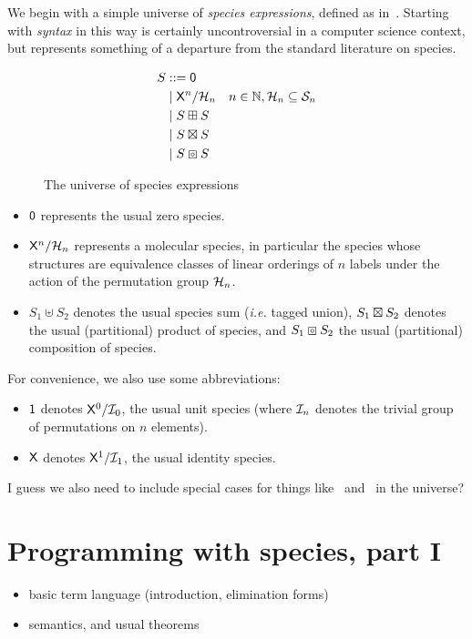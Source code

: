 \documentclass[9pt]{sigplanconf}
\newcommand{\pref}[1]{\prettyref{#1}}
\newcommand{\ie}{\emph{i.e.}\xspace}
\begin{document}
We begin with a simple universe of \emph{species expressions}, defined
as in~\pref{fig:universe}.  Starting with \emph{syntax} in this way is
certainly uncontroversial in a computer science context, but
represents something of a departure from the standard literature on
species.

\begin{figure}
  \centering
  \begin{align*}
    S & ::= \mathsf{0} \\
    & \mid \mathsf{X}^n/\mathcal{H}_n & n \in \mathbb{N}, \mathcal{H}_n \subseteq \mathcal{S}_n \\
    & \mid S \boxplus S \\
    & \mid S \boxtimes S \\
    & \mid S \boxcircle S
  \end{align*}
  \caption{The universe of species expressions}
  \label{fig:universe}
\end{figure}

\begin{itemize}
\item $\mathsf{0}$ represents the usual zero species.

\item $\mathsf{X}^n/\mathcal{H}_n$ represents a molecular species, in particular the
  species whose structures are equivalence classes of linear orderings
  of $n$ labels under the action of the permutation group $\mathcal{H}_n$.

\item $S_1 \uplus S_2$ denotes the usual species sum (\ie tagged
  union), $S_1 \boxtimes S_2$ denotes the usual (partitional) product of
  species, and $S_1 \boxcircle S_2$ the usual (partitional) composition of
  species.
\end{itemize}

For convenience, we also use some abbreviations:
\begin{itemize}
\item $\mathsf{1}$ denotes $\mathsf{X}^0 / \mathcal{I}_0$, the usual unit species (where
  $\mathcal{I}_n$ denotes the trivial group of permutations on $n$ elements).
\item $\mathsf{X}$ denotes $\mathsf{X}^1 / \mathcal{I}_1$, the usual identity species.
\end{itemize}

\begin{bay}
  I guess we also need to include special cases for things like \E\
  and \C\ in the universe?
\end{bay}

\section{Programming with species, part I}\label{sec:prog1}
\begin{itemize}
\item basic term language (introduction, elimination forms)
\item semantics, and usual theorems
\end{itemize}
\end{document}
